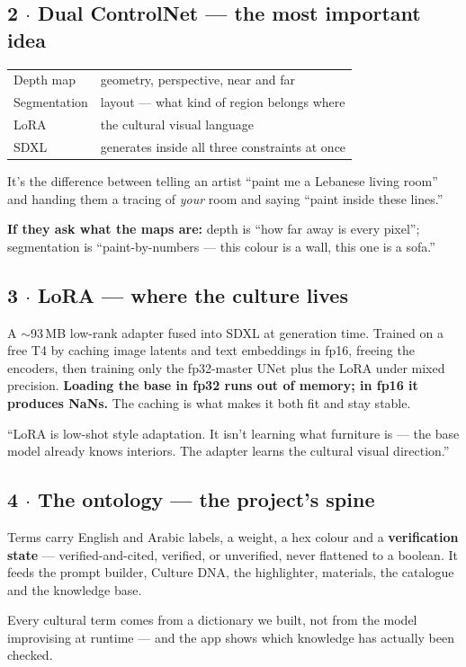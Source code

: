 \documentclass[10.5pt,a4paper]{article}
\begin{document}
\subsection*{2 $\cdot$ Dual ControlNet --- the most important idea}
\begin{tabularx}{\linewidth}{@{}lX@{}}
\toprule
Depth map & geometry, perspective, near and far\\
Segmentation & layout --- what kind of region belongs where\\
LoRA & the cultural visual language\\
SDXL & generates inside all three constraints at once\\
\bottomrule
\end{tabularx}
\begin{sayit}
It's the difference between telling an artist ``paint me a Lebanese living room'' and handing them a
tracing of \emph{your} room and saying ``paint inside these lines.''
\end{sayit}
\textbf{If they ask what the maps are:} depth is ``how far away is every pixel''; segmentation is
``paint-by-numbers --- this colour is a wall, this one is a sofa.''

\subsection*{3 $\cdot$ LoRA --- where the culture lives}
A $\sim$93\,MB low-rank adapter fused into SDXL at generation time. Trained on a free T4 by caching
image latents and text embeddings in fp16, freeing the encoders, then training only the fp32-master
UNet plus the LoRA under mixed precision. \textbf{Loading the base in fp32 runs out of memory; in
fp16 it produces NaNs.} The caching is what makes it both fit and stay stable.
\begin{strength}
``LoRA is low-shot style adaptation. It isn't learning what furniture is --- the base model already
knows interiors. The adapter learns the cultural visual direction.''
\end{strength}

\subsection*{4 $\cdot$ The ontology --- the project's spine}
Terms carry English and Arabic labels, a weight, a hex colour and a \textbf{verification state} ---
verified-and-cited, verified, or unverified, never flattened to a boolean. It feeds the prompt
builder, Culture DNA, the highlighter, materials, the catalogue and the knowledge base.
\begin{sayit}
Every cultural term comes from a dictionary we built, not from the model improvising at runtime ---
and the app shows which knowledge has actually been checked.
\end{sayit}
\end{document}
